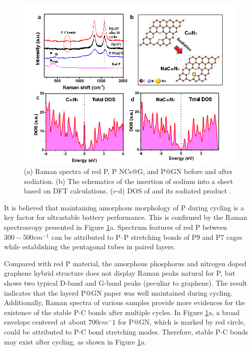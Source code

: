 \begin{figure}  
\includegraphics[width=\textwidth]{figures/figure4_4}
\caption[Raman spectra and DFT calculations]
{
(a) Raman spectra of red P, P NCs@G, and P@GN before and after sodiation. 
(b) The schematics of the insertion of sodium into a  sheet based on DFT calculations. 
(c-d) DOS of  and its sodiated product .
\label{fig:4_4}}
\end{figure}

It is believed that maintaining amorphous morphology of P during cycling is a key factor for ultrastable battery performance. 
This is confirmed by the Raman spectroscopy presented in Figure \ref{fig:4_4}a. 
Spectrum features of red P between $300-500 cm^{-1}$ can be attributed to P–P stretching bonds of P9 and P7 cages while establishing the pentagonal tubes in paired layers.

Compared with red P material, the amorphous phosphorus and nitrogen doped graphene hybrid structure does not display Raman peaks natural for P, but shows two typical D-band and G-band peaks (peculiar to graphene).\cite{Kim2013c} 
The result indicates that the layerd P@GN paper was well maintained during cycling. 
Additionally, Raman spectra of various samples provide more evidences for the existence of the stable P-C bonds after multiple cycles. 
In Figure \ref{fig:4_4}a, a broad envelope centered at about $700 cm^-1$ for P@GN, which is marked by red circle, could be attributed to P-C bond stretching modes. 
Therefore, stable P-C bonds may exist after cycling, as shown in Figure \ref{fig:4_4}a. 

